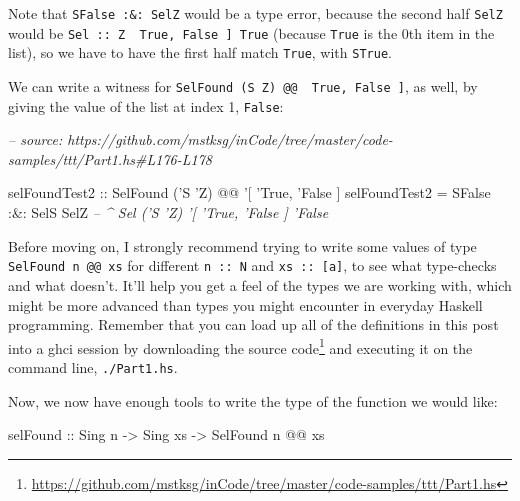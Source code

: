 \documentclass[]{article}
\newenvironment{Shaded}{}{}
\newcommand{\CommentTok}[1]{\textcolor[rgb]{0.38,0.63,0.69}{\textit{#1}}}
\newcommand{\DataTypeTok}[1]{\textcolor[rgb]{0.56,0.13,0.00}{#1}}
\newcommand{\FunctionTok}[1]{\textcolor[rgb]{0.02,0.16,0.49}{#1}}
\newcommand{\NormalTok}[1]{#1}
\newcommand{\OtherTok}[1]{\textcolor[rgb]{0.00,0.44,0.13}{#1}}
\renewcommand{\href}[2]{#2\footnote{\url{#1}}}
\begin{document}
Note that \texttt{SFalse\ :\&:\ SelZ} would be a type error, because the second
half \texttt{SelZ} would be
\texttt{Sel\ ::\ \textquotesingle{}Z\ \textquotesingle{}{[}\ \textquotesingle{}True,\ \textquotesingle{}False\ {]}\ \textquotesingle{}True}
(because \texttt{\textquotesingle{}True} is the 0th item in the list), so we
have to have the first half match \texttt{\textquotesingle{}True}, with
\texttt{STrue}.

We can write a witness for
\texttt{SelFound\ (\textquotesingle{}S\ \textquotesingle{}Z)\ @@\ \textquotesingle{}{[}\ \textquotesingle{}True,\ \textquotesingle{}False\ {]}},
as well, by giving the value of the list at index 1,
\texttt{\textquotesingle{}False}:

\begin{Shaded}
\begin{Highlighting}[]
\CommentTok{-- source: https://github.com/mstksg/inCode/tree/master/code-samples/ttt/Part1.hs#L176-L178}

\OtherTok{selFoundTest2 ::} \DataTypeTok{SelFound}\NormalTok{ ('}\DataTypeTok{S}\NormalTok{ '}\DataTypeTok{Z}\NormalTok{) }\FunctionTok{@@}\NormalTok{ '[ '}\DataTypeTok{True}\NormalTok{, '}\DataTypeTok{False}\NormalTok{ ]}
\NormalTok{selFoundTest2 }\FunctionTok{=} \DataTypeTok{SFalse} \FunctionTok{:&:} \DataTypeTok{SelS} \DataTypeTok{SelZ}
                        \CommentTok{-- ^ Sel ('S 'Z) '[ 'True, 'False ] 'False}
\end{Highlighting}
\end{Shaded}

Before moving on, I strongly recommend trying to write some values of type
\texttt{SelFound\ n\ @@\ xs} for different \texttt{n\ ::\ N} and
\texttt{xs\ ::\ {[}a{]}}, to see what type-checks and what doesn't. It'll help
you get a feel of the types we are working with, which might be more advanced
than types you might encounter in everyday Haskell programming. Remember that
you can load up all of the definitions in this post into a ghci session by
downloading
\href{https://github.com/mstksg/inCode/tree/master/code-samples/ttt/Part1.hs}{the
source code} and executing it on the command line, \texttt{./Part1.hs}.

Now, we now have enough tools to write the type of the function we would like:

\begin{Shaded}
\begin{Highlighting}[]
\NormalTok{selFound}
\OtherTok{    ::} \DataTypeTok{Sing}\NormalTok{ n}
    \OtherTok{->} \DataTypeTok{Sing}\NormalTok{ xs}
    \OtherTok{->} \DataTypeTok{SelFound}\NormalTok{ n }\FunctionTok{@@}\NormalTok{ xs}
\end{Highlighting}
\end{Shaded}
\end{document}
